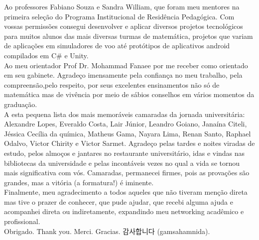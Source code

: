 \begin{agradecimentos}
\noindent
Ao professores Fabiano Souza e Sandra William, que foram meu mentores na primeira seleção do Programa Institucional de Residência Pedagógica. Com vossas permissões consegui desenvolver e aplicar diversos projetos tecnológicos para muitos alunos das mais diversas turmas de matemática, projetos que variam de aplicações em simuladores de voo até protótipos de aplicativos android compilados em C\# e Unity.\\  

\noindent
Ao meu orientador Prof Dr. Mohammad Fanaee por me receber como orientado em seu gabinete. Agradeço imensamente pela confiança no meu trabalho, pela compreensão,pelo respeito, por seus excelentes ensinamentos não só de matemática mas de vivência por meio de sábios conselhos em vários momentos da graduação.\\

\noindent
A esta pequena lista dos mais memoráveis camaradas da jornada universitária:  Alexandre Lopes, Everaldo Costa, Lair Júnior, Leandro Goiano, Janaína Citeli, Jéssica Cecília da química, Matheus Gama, Nayara Lima, Renan Santo, Raphael Odalvo, Victor Chirity e Victor Sarmet. Agradeço pelas tardes e noites viradas de estudo, pelos almoços e jantares no restaurante universitário, idas e vindas nas bibliotecas da universidade e pelas incontáveis vezes no qual a vida se tornou mais significativa com vós. Camaradas, permanecei firmes, pois as provações são grandes, mas a vitória (a formatura!) é iminente. \\

\noindent
Finalmente, meu agradecimento a todos aqueles que não tiveram menção direta mas tive o prazer de conhecer, que pude ajudar, que recebi alguma ajuda e acompanhei direta ou indiretamente, expandindo meu networking acadêmico e profissional.\\ 
 
\noindent
Obrigado. Thank you. Merci. Gracias. 감사합니다 {\tiny(gamsahamnida)}.



	
\end{agradecimentos}
